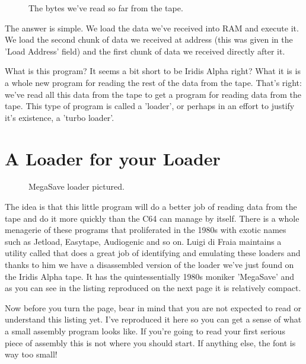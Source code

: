 \begin{figure}[H]
  {
    \begin{adjustbox}{width=10cm,center}
    \end{adjustbox}
  }\caption[]{The bytes we've read so far from the tape.}
\end{figure}

The answer is simple. We load the data we've received into RAM and execute it. We load the second chunk of data
we received at address  (this was given in the 'Load Address' field) and the first chunk of data we received directly after it.

What is this program? It seems a bit short to be Iridis Alpha right? What it is is a whole new program for reading the
rest of the data from the tape. That's right: we've read all this data from the tape to get a program for reading data
from the tape. This type of program is called a 'loader', or perhaps in an effort to justify it's existence, a 'turbo loader'.

\section{A Loader for your Loader}
\begin{figure}[H]
  {
    \begin{adjustbox}{width=10cm,center}
    \end{adjustbox}
  }\caption[]{MegaSave loader pictured.}
\end{figure}

The idea is that this little program will do a better job of reading data from the tape and do it more quickly than the C64 can manage
by itself. There is a whole menagerie of these programs that proliferated in the 1980s with exotic names such as Jetload, Easytape,
Audiogenic and so on. Luigi di Fraia maintains a utility called  that does a great job of identifying and emulating
these loaders and thanks to him we have a disassembled version of the loader we've just found on the Iridis Alpha tape. It has the
quintessentially 1980s moniker 'MegaSave' and as you can see in the listing reproduced on the next page it is relatively compact.

Now before you turn the page, bear in mind that you are not expected to read or understand this listing yet. I've reproduced
it here so you can get a sense of what a small assembly program looks like. If you're going to read your first serious piece
of assembly this is not where you should start. If anything else, the font is way too small! 

